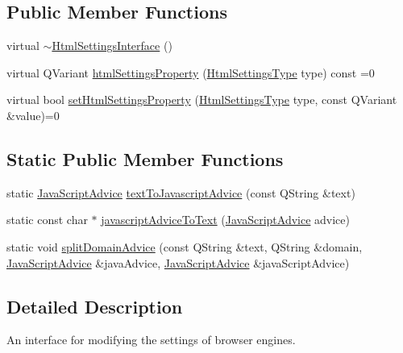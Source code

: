 \subsection*{\-Public \-Member \-Functions}
\begin{DoxyCompactItemize}
\item 
virtual \hyperlink{classKParts_1_1HtmlSettingsInterface_a044f53f15e82bc3c209d578849812cfd}{$\sim$\-Html\-Settings\-Interface} ()
\item 
virtual \-Q\-Variant \hyperlink{classKParts_1_1HtmlSettingsInterface_a00b2a2f9ce6f7b505ab0bbfa4f71eca5}{html\-Settings\-Property} (\hyperlink{classKParts_1_1HtmlSettingsInterface_a62e44360376f423604c5c838ec0e312f}{\-Html\-Settings\-Type} type) const =0
\item 
virtual bool \hyperlink{classKParts_1_1HtmlSettingsInterface_ad345737d10028b838bb1324568d813f3}{set\-Html\-Settings\-Property} (\hyperlink{classKParts_1_1HtmlSettingsInterface_a62e44360376f423604c5c838ec0e312f}{\-Html\-Settings\-Type} type, const \-Q\-Variant \&value)=0
\end{DoxyCompactItemize}
\subsection*{\-Static \-Public \-Member \-Functions}
\begin{DoxyCompactItemize}
\item 
static \hyperlink{classKParts_1_1HtmlSettingsInterface_af6b2303d6834ceff4d5251e10bd9d54b}{\-Java\-Script\-Advice} \hyperlink{classKParts_1_1HtmlSettingsInterface_a6c0aaecc231a6005d37e7c4702f6d302}{text\-To\-Javascript\-Advice} (const \-Q\-String \&text)
\item 
static const char $\ast$ \hyperlink{classKParts_1_1HtmlSettingsInterface_a4f165269160ae72578b0c3c5a1fca22b}{javascript\-Advice\-To\-Text} (\hyperlink{classKParts_1_1HtmlSettingsInterface_af6b2303d6834ceff4d5251e10bd9d54b}{\-Java\-Script\-Advice} advice)
\item 
static void \hyperlink{classKParts_1_1HtmlSettingsInterface_a116a4f8ec62c3558ff75ae8099a2e030}{split\-Domain\-Advice} (const \-Q\-String \&text, \-Q\-String \&domain, \hyperlink{classKParts_1_1HtmlSettingsInterface_af6b2303d6834ceff4d5251e10bd9d54b}{\-Java\-Script\-Advice} \&java\-Advice, \hyperlink{classKParts_1_1HtmlSettingsInterface_af6b2303d6834ceff4d5251e10bd9d54b}{\-Java\-Script\-Advice} \&java\-Script\-Advice)
\end{DoxyCompactItemize}


\subsection{\-Detailed \-Description}
\-An interface for modifying the settings of browser engines. 

